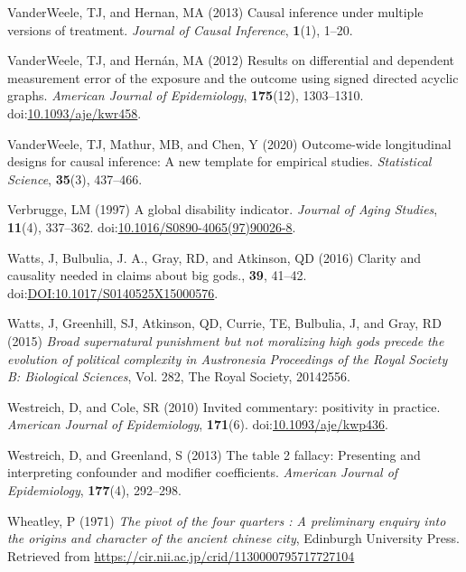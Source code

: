 \documentclass[
  single column]{article}
\newlength{\cslhangindent}
\newenvironment{CSLReferences}[2] %
 {\begin{list}{}{%
  \setlength{\itemindent}{0pt}
  \setlength{\leftmargin}{0pt}
  \setlength{\parsep}{0pt}
  \ifodd #1
   \setlength{\leftmargin}{\cslhangindent}
   \setlength{\itemindent}{-1\cslhangindent}
  \fi
  \setlength{\itemsep}{#2\baselineskip}}}
 {\end{list}}
\begin{document}
\begin{CSLReferences}{1}{0}
VanderWeele, TJ, and Hernan, MA (2013) Causal inference under multiple
versions of treatment. \emph{Journal of Causal Inference},
\textbf{1}(1), 1--20.

VanderWeele, TJ, and Hernán, MA (2012) Results on differential and
dependent measurement error of the exposure and the outcome using signed
directed acyclic graphs. \emph{American Journal of Epidemiology},
\textbf{175}(12), 1303--1310.
doi:\href{https://doi.org/10.1093/aje/kwr458}{10.1093/aje/kwr458}.

VanderWeele, TJ, Mathur, MB, and Chen, Y (2020) Outcome-wide
longitudinal designs for causal inference: A new template for empirical
studies. \emph{Statistical Science}, \textbf{35}(3), 437--466.

Verbrugge, LM (1997) A global disability indicator. \emph{Journal of
Aging Studies}, \textbf{11}(4), 337--362.
doi:\href{https://doi.org/10.1016/S0890-4065(97)90026-8}{10.1016/S0890-4065(97)90026-8}.

Watts, J, Bulbulia, J. A., Gray, RD, and Atkinson, QD (2016) Clarity and
causality needed in claims about big gods., \textbf{39}, 41--42.
doi:\href{https://doi.org/DOI:10.1017/S0140525X15000576}{DOI:10.1017/S0140525X15000576}.

Watts, J, Greenhill, SJ, Atkinson, QD, Currie, TE, Bulbulia, J, and
Gray, RD (2015) \emph{Broad supernatural punishment but not moralizing
high gods precede the evolution of political complexity in
{A}ustronesia} \emph{Proceedings of the Royal Society B: Biological
Sciences}, Vol. 282, The Royal Society, 20142556.

Westreich, D, and Cole, SR (2010) Invited commentary: positivity in
practice. \emph{American Journal of Epidemiology}, \textbf{171}(6).
doi:\href{https://doi.org/10.1093/aje/kwp436}{10.1093/aje/kwp436}.

Westreich, D, and Greenland, S (2013) The table 2 fallacy: Presenting
and interpreting confounder and modifier coefficients. \emph{American
Journal of Epidemiology}, \textbf{177}(4), 292--298.

Wheatley, P (1971) \emph{The pivot of the four quarters : A preliminary
enquiry into the origins and character of the ancient chinese city},
Edinburgh University Press. Retrieved from
\url{https://cir.nii.ac.jp/crid/1130000795717727104}


\end{CSLReferences}
\end{document}
